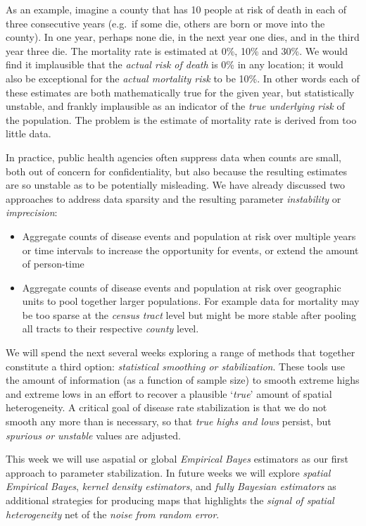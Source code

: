 \documentclass[
]{book}
\providecommand{\tightlist}{%
  \setlength{\itemsep}{0pt}\setlength{\parskip}{0pt}}
\begin{document}
As an example, imagine a county that has 10 people at risk of death in each of three consecutive years (e.g.~if some die, others are born or move into the county). In one year, perhaps none die, in the next year one dies, and in the third year three die. The mortality rate is estimated at 0\%, 10\% and 30\%. We would find it implausible that the \emph{actual risk of death} is 0\% in any location; it would also be exceptional for the \emph{actual mortality risk} to be 10\%. In other words each of these estimates are both mathematically true for the given year, but statistically unstable, and frankly implausible as an indicator of the \emph{true underlying risk} of the population. The problem is the estimate of mortality rate is derived from too little data.

In practice, public health agencies often suppress data when counts are small, both out of concern for confidentiality, but also because the resulting estimates are so unstable as to be potentially misleading. We have already discussed two approaches to address data sparsity and the resulting parameter \emph{instability} or \emph{imprecision}:

\begin{itemize}
\tightlist
\item
  Aggregate counts of disease events and population at risk over multiple years or time intervals to increase the opportunity for events, or extend the amount of person-time
\item
  Aggregate counts of disease events and population at risk over geographic units to pool together larger populations. For example data for mortality may be too sparse at the \emph{census tract} level but might be more stable after pooling all tracts to their respective \emph{county} level.
\end{itemize}

We will spend the next several weeks exploring a range of methods that together constitute a third option: \emph{statistical smoothing or stabilization}. These tools use the amount of information (as a function of sample size) to smooth extreme highs and extreme lows in an effort to recover a plausible `\emph{true}' amount of spatial heterogeneity. A critical goal of disease rate stabilization is that we do not smooth any more than is necessary, so that \emph{true highs and lows} persist, but \emph{spurious or unstable} values are adjusted.

This week we will use aspatial or global \emph{Empirical Bayes} estimators as our first approach to parameter stabilization. In future weeks we will explore \emph{spatial Empirical Bayes}, \emph{kernel density estimators}, and \emph{fully Bayesian estimators} as additional strategies for producing maps that highlights the \emph{signal of spatial heterogeneity} net of the \emph{noise from random error}.
\end{document}
